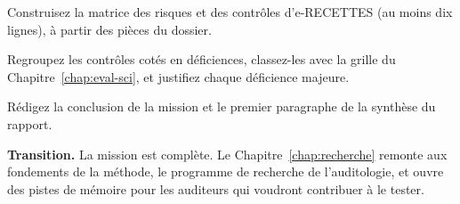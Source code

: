 \begin{boxexo}[title={\ding{45}\quad Exercice~14.1. La matrice \niveaumoyen}]
Construisez la matrice des risques et des contrôles d'e-RECETTES (au moins
dix lignes), à partir des pièces du dossier.
\end{boxexo}

\begin{boxexo}[title={\ding{45}\quad Exercice~14.2. Les déficiences \niveauexpert}]
Regroupez les contrôles cotés \NON{} en déficiences, classez-les avec la
grille du Chapitre~\ref{chap:eval-sci}, et justifiez chaque déficience
majeure.
\end{boxexo}

\begin{boxexo}[title={\ding{45}\quad Exercice~14.3. La conclusion \niveauexpert}]
Rédigez la conclusion de la mission et le premier paragraphe de la
synthèse du rapport.
\end{boxexo}

\begin{boxinfo}
\textbf{Transition.} La mission est complète. Le
Chapitre~\ref{chap:recherche} remonte aux fondements de la méthode, le
programme de recherche de l'auditologie, et ouvre des pistes de mémoire
pour les auditeurs qui voudront contribuer à le tester.
\end{boxinfo}

